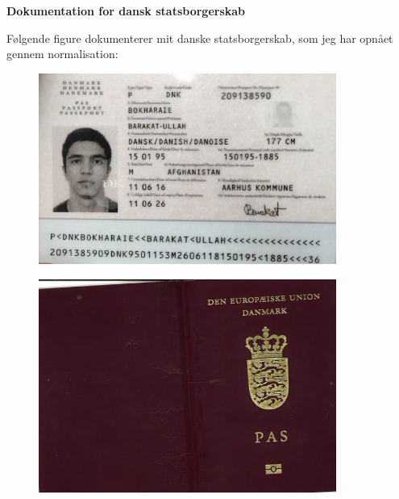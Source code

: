 \documentclass[../Ansoegning.tex]{subfiles}
\begin{document}
\begin{center}
    \textbf{\LARGE{Dokumentation for dansk statsborgerskab}}\vspace{-3ex}
\end{center}

Følgende figure dokumenterer mit danske statsborgerskab, som jeg har opnået gennem normalisation:
\begin{figure}[H]
	\centering
	\includegraphics[width=0.87\textwidth]{Eksterne_filer/pas_ind.jpg}
\end{figure}

\begin{figure}[H]
	\centering
	\includegraphics[width=0.87\textwidth]{Eksterne_filer/pas_for.jpg}
\end{figure}
\end{document}
